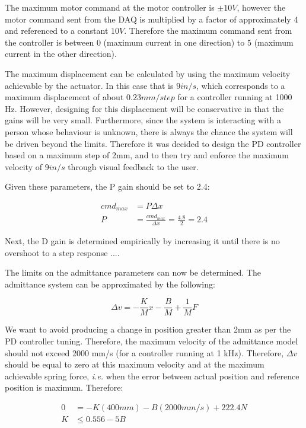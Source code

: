 \documentclass[12pt]{report}
\begin{document}
	The maximum motor command at the motor controller is $\pm 10V$, however the motor command sent from the DAQ is multiplied by a factor of approximately 4 and referenced to a constant $10 V$. Therefore the maximum command sent from the controller is between 0 (maximum current in one direction) to 5 (maximum current in the other direction). 
	
	The maximum displacement can be calculated by using the maximum velocity achievable by the actuator. In this case that is $9 in/s$, which corresponds to a maximum displacement of about $0.23 mm/step$ for a controller running at 1000 Hz. However, designing for this displacement will be conservative in that the gains will be very small. Furthermore, since the system is interacting with a person whose behaviour is unknown, there is always the chance the system will be driven beyond the limits. Therefore it was decided to design the PD controller based on a maximum step of 2mm, and to then try and enforce the maximum velocity of $9 in/s$ through visual feedback to the user.
	
	Given these parameters, the P gain should be set to 2.4:
	
	\begin{align*}
		cmd_{max} &= P\Delta x \\
		P &= \frac{cmd_{max}}{\Delta x} = \frac{4.8}{2} =  2.4
	\end{align*}
	
	Next, the D gain is determined empirically by increasing it until there is no overshoot to a step response ....
	
	The limits on the admittance parameters can now be determined. The admittance system can be approximated by the following:
	
	\begin{equation}
		\Delta v = - \frac{K}{M}x - \frac{B}{M} + \frac{1}{M}F
	\end{equation}
	
	We want to avoid producing a change in position greater than 2mm as per the PD controller tuning. Therefore, the maximum velocity of the admittance model should not exceed 2000 mm/s (for a controller running at 1 kHz). Therefore, $\Delta v$ should be equal to zero at this maximum velocity and at the maximum achievable spring force, \textit{i.e.} when the error between actual position and reference position is maximum. Therefore:
	
	\begin{align}
		0 &= -K(400mm) - B(2000mm/s) + 222.4N \\
		K &\leq 0.556 - 5B   
	\end{align}
	
\end{document}
